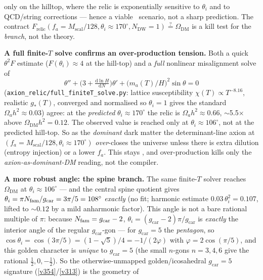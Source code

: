 only on the hilltop, where the relic is exponentially sensitive to $\theta_i$ and to QCD/string
corrections --- hence a viable \mC\ scenario, not a sharp prediction. The contract
$F_{\mathrm{relic}}(f_a{=}M_{\mathrm{scal}}/128,\theta_i{\approx}170^\circ,N_{\mathrm{DW}}{=}1)\stackrel{?}{=}\Omega_{\mathrm{DM}}$
is a kill test for the \emph{branch}, not the theory.
\par\smallskip\noindent\textbf{A full finite-$T$ solve confirms an over-production tension.} Both a quick
$\theta^2F$ estimate ($F(\theta_i)\approx4$ at the hill-top) and a \emph{full} nonlinear misalignment solve of
\[
  \theta'' + \bigl(3+\tfrac{\mathrm{d}\ln H}{\mathrm{d}N}\bigr)\theta' + \bigl(m_a(T)/H\bigr)^2\sin\theta=0
\]
(\texttt{axion\_relic/full\_finiteT\_solve.py}: lattice susceptibility $\chi(T)\propto T^{-8.16}$, realistic
$g_*(T)$, converged and normalised so $\theta_i{=}1$ gives the standard $\Omega_a h^2\approx0.03$) agree: at
the \emph{predicted} $\theta_i\approx170^\circ$ the relic is $\Omega_a h^2\approx0.66$, $\sim$5.5$\times$
above $\Omega_{\mathrm{DM}}h^2=0.12$. The observed value is reached only at $\theta_i\approx106^\circ$, not at
the predicted hill-top. So as the \emph{dominant} dark matter the determinant-line axion at
$(f_a{=}M_{\mathrm{scal}}/128,\theta_i{\approx}170^\circ)$ \emph{over}-closes the universe unless there is
extra dilution (entropy injection) or a lower $f_a$. This stays \mC, and over-production kills only the
\emph{axion-as-dominant-DM} reading, not the compiler.
\par\smallskip\noindent\textbf{A more robust angle: the spine branch.}
 The same finite-$T$ solver reaches $\Omega_{\mathrm{DM}}$ at
$\theta_i\approx106^\circ$ --- and the central spine quotient gives $\theta_i=\pi N_{\mathrm{fam}}/g_{\mathrm{car}}=3\pi/5=108^\circ$
\emph{exactly} (no fit; harmonic estimate $0.03\,\theta_i^2=0.107$, lifted to
${\sim}0.12$ by a mild anharmonic factor).
 This angle is not a bare rational multiple of $\pi$: because
$N_{\mathrm{fam}}=g_{\mathrm{car}}-2$, $\theta_i=(g_{\mathrm{car}}-2)\pi/g_{\mathrm{car}}$ is \emph{exactly} the interior
angle of the regular $g_{\mathrm{car}}$-gon --- for $g_{\mathrm{car}}=5$ the \emph{pentagon}, so
$\cos\theta_i=\cos(3\pi/5)=(1-\sqrt5)/4=-1/(2\varphi)$ with $\varphi=2\cos(\pi/5)$, and this golden character is
\emph{unique} to $g_{\mathrm{car}}=5$ (the small $n$-gons $n=3,4,6$ give the rational $\tfrac12,0,-\tfrac12$). So the
otherwise-unmapped golden/icosahedral $g_{\mathrm{car}}=5$ signature (\vref{v354}/\vref{v313}) is the geometry of
